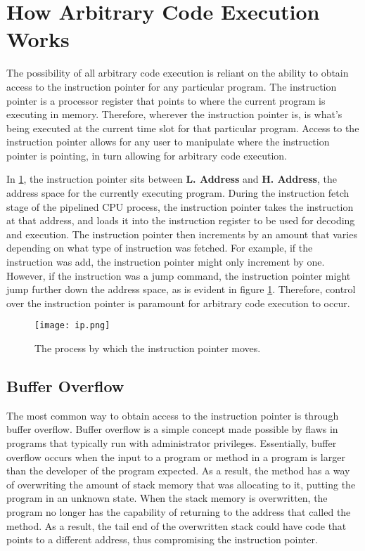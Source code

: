 \section{How Arbitrary Code Execution Works}

The possibility of all arbitrary code execution is reliant on the ability to obtain access to the instruction pointer for any particular program. The instruction pointer is a processor register that points to where the current program is executing in memory. Therefore, wherever the instruction pointer is, is what’s being executed at the current time slot for that particular program. Access to the instruction pointer allows for any user to manipulate where the instruction pointer is pointing, in turn allowing for arbitrary code execution. 

In \ref{fig:ip}, the instruction pointer sits between \textbf{L. Address} and \textbf{H. Address}, the address space for the currently executing program. During the instruction fetch stage of the pipelined CPU process, the instruction pointer takes the instruction at that address, and loads it into the instruction register to be used for decoding and execution. The instruction pointer then increments by an amount that varies depending on what type of instruction was fetched. For example, if the instruction was add, the instruction pointer might only increment by one. However, if the instruction was a jump command, the instruction pointer might jump further down the address space, as is evident in figure \ref{fig:ip}. Therefore, control over the instruction pointer is paramount for arbitrary code execution to occur. \cite{instruction_pointer_1999}

\begin{figure}
\texttt{[image: ip.png]}
\caption{The process by which the instruction pointer moves.}
\label{fig:ip}
\end{figure}

\subsection{Buffer Overflow}

The most common way to obtain access to the instruction pointer is through buffer overflow. Buffer overflow is a simple concept made possible by flaws in programs that typically run with administrator privileges. Essentially, buffer overflow occurs when the input to a program or method in a program is larger than the developer of the program expected. As a result, the method has a way of overwriting the amount of stack memory that was allocating to it, putting the program in an unknown state. When the stack memory is overwritten, the program no longer has the capability of returning to the address that called the method. As a result, the tail end of the overwritten stack could have code that points to a different address, thus compromising the instruction pointer.

